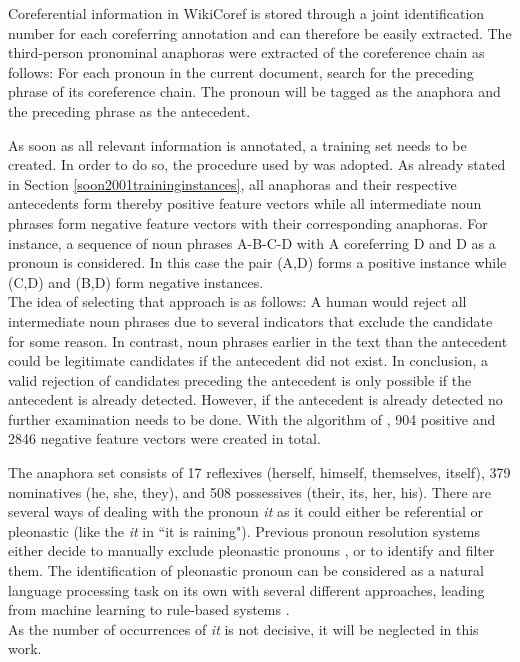Coreferential information in WikiCoref is stored through a joint identification number for each coreferring annotation and can therefore be easily extracted. The third-person pronominal anaphoras were extracted of the coreference chain as follows: For each pronoun in the current document, search for the preceding phrase of its coreference chain. The pronoun will be tagged as the anaphora and the preceding phrase as the antecedent. 

As soon as all relevant information is annotated, a training set needs to be created. In order to do so, the procedure used by \cite{soon2001machine} was adopted. As already stated in Section \ref{soon2001traininginstances}, all anaphoras and their respective antecedents form thereby positive feature vectors while all intermediate noun phrases form negative feature vectors with their corresponding anaphoras. For instance, a sequence of noun phrases A-B-C-D with A coreferring D and D as a pronoun is considered. In this case the pair (A,D) forms a positive instance while (C,D) and (B,D) form negative instances.\\
The idea of selecting that approach is as follows: A human would reject all intermediate noun phrases due to several indicators that exclude the candidate for some reason. In contrast, noun phrases earlier in the text than the antecedent could be legitimate candidates if the antecedent did not exist. In conclusion, a valid rejection of candidates preceding the antecedent is only possible if the antecedent is already detected. However, if the antecedent is already detected no further examination needs to be done. With the algorithm of \cite{soon2001machine}, 904 positive and 2846 negative feature vectors were created in total.

The anaphora set consists of 17 reflexives (herself, himself, themselves, itself), 379 nominatives (he, she, they), and 508 possessives (their, its, her, his). There are several ways of dealing with the pronoun \textit{it} as it could either be referential or pleonastic (like the \textit{it} in ``it is raining"). Previous pronoun resolution systems either decide to manually exclude pleonastic pronouns \citep{kennedy1996anaphora,bergsma2005automatic}, or to identify and filter them. The identification of pleonastic pronoun can be considered as a natural language processing task on its own with several different approaches, leading from machine learning \citep{boyd2005identifying} to rule-based systems \citep{lappin1994algorithm}.\\
As the number of occurrences of \textit{it} is not decisive, it will be neglected in this work.


